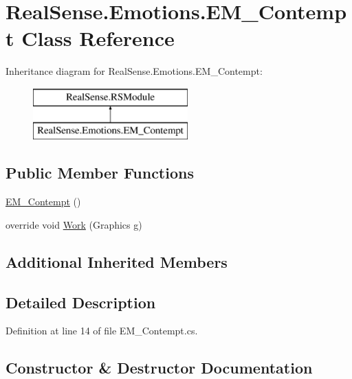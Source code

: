 \hypertarget{class_real_sense_1_1_emotions_1_1_e_m___contempt}{}\section{Real\+Sense.\+Emotions.\+E\+M\+\_\+\+Contempt Class Reference}
\label{class_real_sense_1_1_emotions_1_1_e_m___contempt}
Inheritance diagram for Real\+Sense.\+Emotions.\+E\+M\+\_\+\+Contempt\+:\begin{figure}[H]
\begin{center}
\leavevmode
\includegraphics[height=2.000000cm]{class_real_sense_1_1_emotions_1_1_e_m___contempt}
\end{center}
\end{figure}
\subsection*{Public Member Functions}
\begin{DoxyCompactItemize}
\item 
\hyperlink{class_real_sense_1_1_emotions_1_1_e_m___contempt_af2203e6c540c756cd6b8d0190d04c46f}{E\+M\+\_\+\+Contempt} ()
\item 
override void \hyperlink{class_real_sense_1_1_emotions_1_1_e_m___contempt_a7ea208f926c1888f028cbe6d6fe14e2f}{Work} (Graphics g)
\end{DoxyCompactItemize}
\subsection*{Additional Inherited Members}


\subsection{Detailed Description}


Definition at line 14 of file E\+M\+\_\+\+Contempt.\+cs.



\subsection{Constructor \& Destructor Documentation}
\mbox{\label{class_real_sense_1_1_emotions_1_1_e_m___contempt_af2203e6c540c756cd6b8d0190d04c46f}} 
